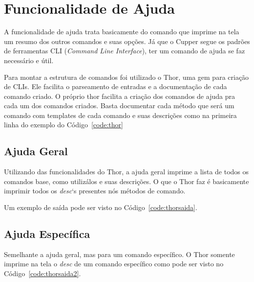 \section{Funcionalidade de Ajuda}
\label{sec:help}

A funcionalidade de ajuda trata basicamente do comando que imprime na tela um resumo
dos outros comandos e suas opções. Já que o Cupper segue os padrões de ferramentas
CLI (\textit{Command Line Interface}), ter um comando de ajuda se faz necessário
e útil.

Para montar a estrutura de comandos foi utilizado o Thor, uma gem para criação
de CLIs. Ele facilita o parseamento de entradas e a documentação de cada comando criado.
O próprio thor facilita a criação dos comandos de ajuda pra cada um dos comandos
criados. Basta documentar cada método que será um comando com templates de cada
comando e suas descrições como na primeira linha do exemplo do Código~\ref{code:thor}

\noindent\begin{minipage}{\textwidth}
  \lstset{style=shell}
  
\end{minipage}\hfill

\subsection{Ajuda Geral}
Utilizando das funcionalidades do Thor, a ajuda geral imprime a lista de todos
os comandos base, como utilizálos e suas descrições. O que o Thor faz é basicamente
imprimir todos os \textit{desc}`s presentes nós métodos de comando.

Um exemplo de saída pode ser visto no Código~\ref{code:thorsaida}.

\noindent\begin{minipage}{\textwidth}
  \lstset{style=shell}
  
\end{minipage}\hfill


\subsection{Ajuda Específica}
Semelhante a ajuda geral, mas para um comando específico. O Thor somente imprime
na tela o \textit{desc} de um comando específico como pode ser visto no Código~\ref{code:thorsaida2}.

\noindent\begin{minipage}{\textwidth}
  \lstset{style=shell}
  
\end{minipage}\hfill
